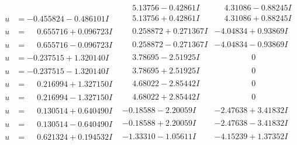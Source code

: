 \documentclass[1p]{elsarticle_modified}
\theoremstyle{definition}
\begin{document}
$$\begin{array}{c|c|c}
 & \phantom{-}5.13756 - 0.42861 I & \phantom{-}4.31086 - 0.88245 I \\ \hline\begin{aligned}
u &= -0.455824 - 0.486101 I\end{aligned}
 & \phantom{-}5.13756 + 0.42861 I & \phantom{-}4.31086 + 0.88245 I \\ \hline\begin{aligned}
u &= \phantom{-}0.655716 + 0.096723 I\end{aligned}
 & \phantom{-}0.258872 + 0.271367 I & -4.04834 + 0.93869 I \\ \hline\begin{aligned}
u &= \phantom{-}0.655716 - 0.096723 I\end{aligned}
 & \phantom{-}0.258872 - 0.271367 I & -4.04834 - 0.93869 I \\ \hline\begin{aligned}
u &= -0.237515 + 1.320140 I\end{aligned}
 & \phantom{-}3.78695 - 2.51925 I & \phantom{-0.000000 } 0 \\ \hline\begin{aligned}
u &= -0.237515 - 1.320140 I\end{aligned}
 & \phantom{-}3.78695 + 2.51925 I & \phantom{-0.000000 } 0 \\ \hline\begin{aligned}
u &= \phantom{-}0.216994 + 1.327150 I\end{aligned}
 & \phantom{-}4.68022 - 2.85442 I & \phantom{-0.000000 } 0 \\ \hline\begin{aligned}
u &= \phantom{-}0.216994 - 1.327150 I\end{aligned}
 & \phantom{-}4.68022 + 2.85442 I & \phantom{-0.000000 } 0 \\ \hline\begin{aligned}
u &= \phantom{-}0.130514 + 0.640490 I\end{aligned}
 & -0.18588 - 2.20059 I & -2.47638 + 3.41832 I \\ \hline\begin{aligned}
u &= \phantom{-}0.130514 - 0.640490 I\end{aligned}
 & -0.18588 + 2.20059 I & -2.47638 - 3.41832 I \\ \hline\begin{aligned}
u &= \phantom{-}0.621324 + 0.194532 I\end{aligned}
 & -1.33310 - 1.05611 I & -4.15239 + 1.37352 I \\ \hline\begin{aligned}

\end{aligned}
\end{array}$$
\end{document}
